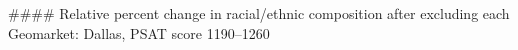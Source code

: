 #### Relative percent change in racial/ethnic composition after excluding each Geomarket: Dallas, PSAT score 1190–1260
